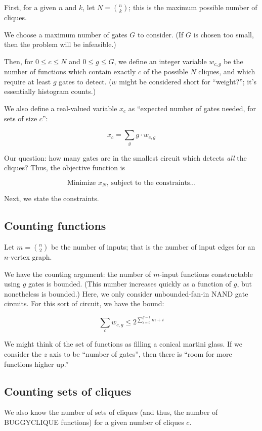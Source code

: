 \documentclass[12pt]{article}
\theoremstyle{definition}
\begin{document}
First, for a given $n$ and $k$, let $N = {n \choose k}$; this is
the maximum possible number of cliques.

We choose a maximum number of gates $G$ to consider. (If $G$ is
chosen too small, then the problem will be infeasible.)

Then, for $0 \le c \le N$ and $0 \le g \le G$,
we define an integer variable $w_{c,g}$ be the number of functions which contain
exactly $c$ of the possible $N$ cliques, and which require at least
$g$ gates to detect. ($w$ might be considered short for ``weight?'';
it's essentially histogram counts.)

We also define a real-valued variable
$x_c$ as ``expected number of gates needed, for sets of size $c$'':

\[
x_c = \sum_g g \cdot w_{c,g}
\]

Our question: how many gates are in the smallest circuit
which detects {\em all} the cliques? Thus, the objective function
is

\[
\text{Minimize }x_N\text{, subject to the constraints...}
\]

Next, we state the constraints.

\subsection{Counting functions}

Let $m = {n \choose 2}$ be the number of inputs; that is the number
of input edges for an $n$-vertex graph.

We have the counting argument: the number of $m$-input functions
constructable using $g$ gates is bounded. (This number increases
quickly as a function of $g$, but nonetheless is bounded.)
Here, we only consider unbounded-fan-in NAND gate circuits. For
this sort of circuit, we have the bound:

\[
\sum_c w_{c,g} \le 2^{\sum_{i=0}^{g-1} m+i}
\]

We might think of the set of functions as filling a conical
martini glass. If we consider the $z$ axis to be ``number of gates'',
then there is ``room for more functions higher up.''

\subsection{Counting sets of cliques}

We also know the number of sets of cliques (and thus, the number
of BUGGYCLIQUE functions) for a given number of cliques $c$.
\end{document}

